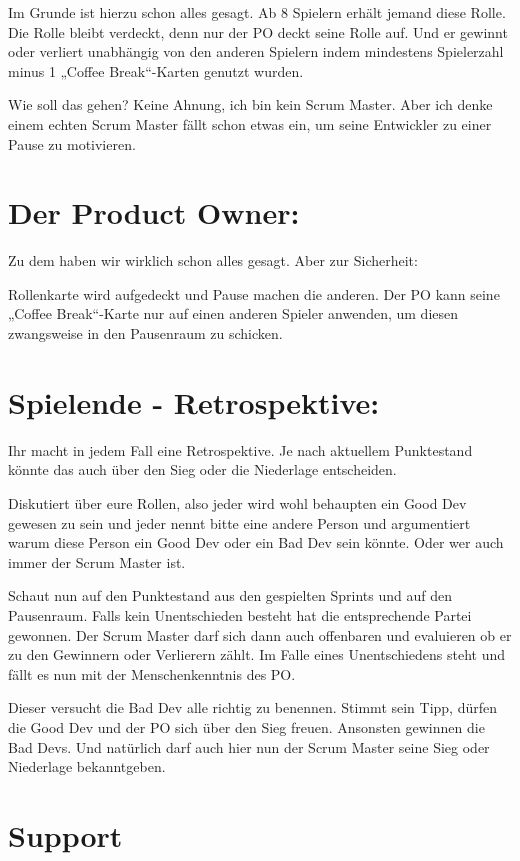 \documentclass[10pt,a4paper]{article}
\begin{document}
Im Grunde ist hierzu schon alles gesagt. Ab 8 Spielern erhält jemand diese Rolle. Die Rolle bleibt verdeckt, denn nur der PO deckt seine Rolle auf. Und er gewinnt oder verliert unabhängig von den anderen Spielern indem mindestens Spielerzahl minus 1 „Coffee Break“-Karten genutzt wurden.

Wie soll das gehen? Keine Ahnung, ich bin kein Scrum Master. Aber ich denke einem echten Scrum Master fällt schon etwas ein, um seine Entwickler zu einer Pause zu motivieren.

\clearpage
\section{Der Product Owner:}

Zu dem haben wir wirklich schon alles gesagt. Aber zur Sicherheit:

Rollenkarte wird aufgedeckt und Pause machen die anderen. Der PO kann seine „Coffee Break“-Karte nur auf einen anderen Spieler anwenden, um diesen zwangsweise in den Pausenraum zu schicken.

\section{Spielende - Retrospektive:}

Ihr macht in jedem Fall eine Retrospektive. Je nach aktuellem Punktestand könnte das auch über den Sieg oder die Niederlage entscheiden.

Diskutiert über eure Rollen, also jeder wird wohl behaupten ein Good Dev gewesen zu sein und jeder nennt bitte eine andere Person und argumentiert warum diese Person ein Good Dev oder ein Bad Dev sein könnte. Oder wer auch immer der Scrum Master ist.

Schaut nun auf den Punktestand aus den gespielten Sprints und auf den Pausenraum. Falls kein Unentschieden besteht hat die entsprechende Partei gewonnen. Der Scrum Master darf sich dann auch offenbaren und evaluieren ob er zu den Gewinnern oder Verlierern zählt. Im Falle eines Unentschiedens steht und fällt es nun mit der Menschenkenntnis des PO.

Dieser versucht die Bad Dev alle richtig zu benennen. Stimmt sein Tipp, dürfen die Good Dev und der PO sich über den Sieg freuen. Ansonsten gewinnen die Bad Devs. Und natürlich darf auch hier nun der Scrum Master seine Sieg oder Niederlage bekanntgeben.

\section{Support}
\end{document}
